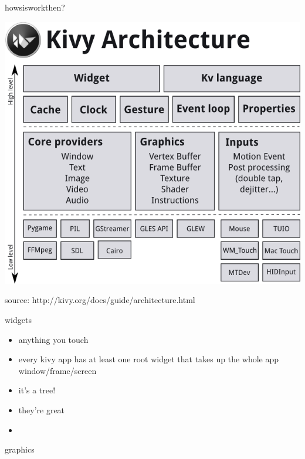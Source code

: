 \documentclass{beamer}
\begin{document}
\begin{frame}{howsisworkthen?}

\begin{center}
  \includegraphics[height=.75\textheight]{architecture.png}
\end{center}

source: http://kivy.org/docs/guide/architecture.html

\end{frame}


\begin{frame}{widgets}
\begin{itemize}
  \item anything you touch
  \pause
  \item every kivy app has at least one root widget that takes up the whole app window/frame/screen
  \pause
  \item it's a tree!
  \pause
  \item they're great
  \pause
  \item
\end{itemize}

\end{frame}



\begin{frame}{graphics}
\end{frame}
\end{document}
